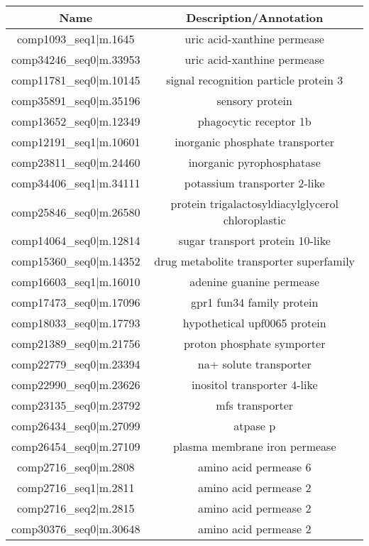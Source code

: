 \begin{table}
    \centering
    \begin{tabular}{|c|c|}
        \hline
        \textbf{Name} & \textbf{Description/Annotation} \\
        \hline
        comp1093\_seq1|m.1645&uric acid-xanthine permease\\
        comp34246\_seq0|m.33953&uric acid-xanthine permease	\\
        comp11781\_seq0|m.10145&signal recognition particle protein 3\\
        comp35891\_seq0|m.35196&sensory protein\\
        comp13652\_seq0|m.12349&phagocytic receptor 1b\\
        comp12191\_seq1|m.10601&inorganic phosphate transporter\\
        comp23811\_seq0|m.24460&inorganic pyrophosphatase \\
        comp34406\_seq1|m.34111&potassium transporter 2-like \\
        comp25846\_seq0|m.26580&protein trigalactosyldiacylglycerol chloroplastic\\
        comp14064\_seq0|m.12814&sugar transport protein 10-like\\
        comp15360\_seq0|m.14352&drug metabolite transporter superfamily\\
        comp16603\_seq1|m.16010&adenine guanine permease\\
        comp17473\_seq0|m.17096&gpr1 fun34 family protein\\
        comp18033\_seq0|m.17793&hypothetical upf0065 protein\\
        comp21389\_seq0|m.21756&proton phosphate symporter\\
        comp22779\_seq0|m.23394&na+ solute transporter\\
        comp22990\_seq0|m.23626&inositol transporter 4-like\\
        comp23135\_seq0|m.23792&mfs transporter\\
        comp26434\_seq0|m.27099&atpase p	\\
        comp26454\_seq0|m.27109&plasma membrane iron permease\\
        comp2716\_seq0|m.2808&amino acid permease 6\\			
        comp2716\_seq1|m.2811&amino acid permease 2\\			
        comp2716\_seq2|m.2815&amino acid permease 2\\			
        comp30376\_seq0|m.30648&amino acid permease 2\\

\end{tabular}
\end{table}
